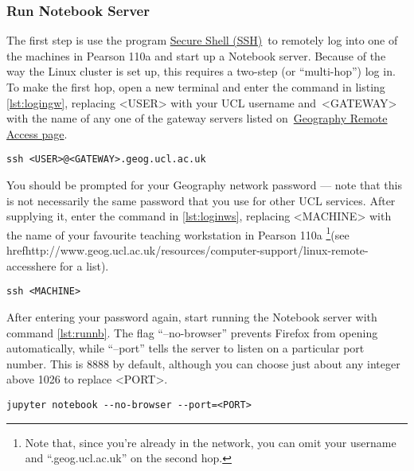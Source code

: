 \documentclass[a4paper]{article}
\begin{document}
\subsubsection{Run Notebook Server}
\label{sec:runnb}

The first step is use the program \href{http://linuxcommand.org/man_pages/ssh1.html}{Secure Shell (SSH)}~to remotely log into one of the machines in Pearson 110a and start up a Notebook server.
Because of the way the Linux cluster is set up, this requires a two-step (or ``multi-hop'') log in.
To make the first hop, open a new terminal and enter the command in listing \ref{lst:logingw}, replacing \textless{}USER\textgreater{} with your UCL username and~\textless{}GATEWAY\textgreater{} with the name of any one of the gateway servers listed on~\href{http://www.geog.ucl.ac.uk/resources/computer-support/linux-remote-access}{Geography Remote Access page}.

\begin{lstlisting}[caption={Login to gateway}, label={lst:logingw}]
ssh <USER>@<GATEWAY>.geog.ucl.ac.uk
\end{lstlisting}

You should be prompted for your Geography network password --- note that this is not necessarily the same password that you use for other UCL services.
After supplying it, enter the command in \ref{lst:loginws}, replacing \textless{}MACHINE\textgreater{} with the name of your favourite teaching workstation in Pearson 110a \footnote{Note that, since you're already in the network, you can omit your username and ``.geog.ucl.ac.uk'' on the second hop.}(see href{http://www.geog.ucl.ac.uk/resources/computer-support/linux-remote-access}{here} for a list). 

\begin{lstlisting}[caption={Login to workstation}, label={lst:loginws}]
ssh <MACHINE>
\end{lstlisting}

After entering your password again, start running the Notebook server with command \ref{lst:runnb}.
The flag ``--no-browser'' prevents Firefox from opening automatically, while ``--port'' tells the server to listen on a particular port number.
This is 8888 by default, although you can choose just about any integer above 1026 to replace \textless{}PORT\textgreater{}.

\begin{lstlisting}[caption={Run Notebook server}, label={lst:runnb}]
jupyter notebook --no-browser --port=<PORT>
\end{lstlisting}
\end{document}
